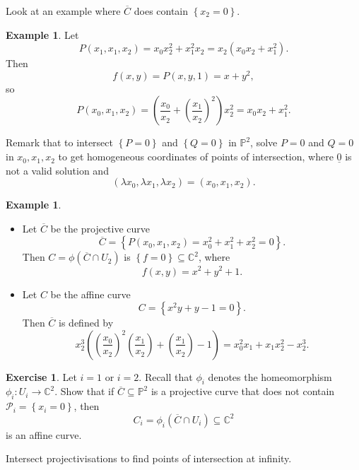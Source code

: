 \documentclass{article}
\newcommand{\C}{\mathbb{C}}
\renewcommand{\P}{\mathbb{P}}
\newcommand{\rb}[1]{\left( #1 \right)}
\newcommand{\cb}[1]{\left\{ #1 \right\}}
\theoremstyle{definition}\newtheorem{definition}{Definition}[section]
\theoremstyle{definition}\newtheorem{notation}[definition]{Notation}
\theoremstyle{definition}\newtheorem{remark}[definition]{Remark}
\theoremstyle{definition}\newtheorem{example1}[definition]{Example}
\theoremstyle{definition}\newtheorem{fact}{Fact}
\theoremstyle{definition}\newtheorem{exercise}{Exercise}
\theoremstyle{definition}\newtheorem*{example2}{Example}
\begin{document}
Look at an example where $ \overline{C} $ does contain $ \cb{x_2 = 0} $.

\begin{example2}
Let
$$ P\rb{x_1, x_1, x_2} = x_0x_2^2 + x_1^2x_2 = x_2\rb{x_0x_2 + x_1^2}. $$
Then
$$ f\rb{x, y} = P\rb{x, y, 1} = x + y^2, $$
so
$$ P\rb{x_0, x_1, x_2} = \rb{\dfrac{x_0}{x_2} + \rb{\dfrac{x_1}{x_2}}^2}x_2^2 = x_0x_2 + x_1^2. $$
\end{example2}

Remark that to intersect $ \cb{P = 0} $ and $ \cb{Q = 0} $ in $ \P^2 $, solve $ P = 0 $ and $ Q = 0 $ in $ x_0, x_1, x_2 $ to get homogeneous coordinates of points of intersection, where $ \underline{0} $ is not a valid solution and
$$ \rb{\lambda x_0, \lambda x_1, \lambda x_2} = \rb{x_0, x_1, x_2}. $$

\begin{example1}
\hfill
\begin{itemize}
\item Let $ \overline{C} $ be the projective curve
$$ \overline{C} = \cb{P\rb{x_0, x_1, x_2} = x_0^2 + x_1^2 + x_2^2 = 0}. $$
Then $ C = \phi\rb{\overline{C} \cap U_2} $ is $ \cb{f = 0} \subseteq \C^2 $, where
$$ f\rb{x, y} = x^2 + y^2 + 1. $$
\item Let $ C $ be the affine curve
$$ C = \cb{x^2y + y - 1 = 0}. $$
Then $ \overline{C} $ is defined by
$$ x_2^3\rb{\rb{\dfrac{x_0}{x_2}}^2\rb{\dfrac{x_1}{x_2}} + \rb{\dfrac{x_1}{x_2}} - 1} = x_0^2x_1 + x_1x_2^2 - x_2^3. $$
\end{itemize}
\end{example1}

\begin{exercise}
Let $ i = 1 $ or $ i = 2 $. Recall that $ \phi_i $ denotes the homeomorphism $ \phi_i : U_i \to \C^2 $. Show that if $ \overline{C} \subseteq \P^2 $ is a projective curve that does not contain $ \mathcal{P}_i = \cb{x_i = 0} $, then
$$ C_i = \phi_i\rb{\overline{C} \cap U_i} \subseteq \C^2 $$
is an affine curve.
\end{exercise}


Intersect projectivisations to find points of intersection at infinity.
\end{document}
